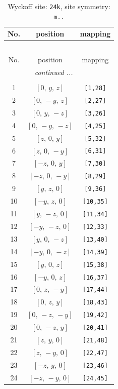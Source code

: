 \documentclass[fleqn,8pt]{jsarticle}
\begin{document}
\begin{longtable}{ccc}
\caption{Wyckoff site: {\tt 24k}, site symmetry: {\tt m..}}
 \\
 \hline \hline
No. & position & mapping \\ \hline \endfirsthead

\multicolumn{2}{l}{\tablename\ \thetable{}} \\
 \hline \hline
No. & position & mapping \\ \hline \endhead

 \hline \hline
\multicolumn{2}{r}{\footnotesize\it continued ...} \\ \endfoot

 \hline \hline
\multicolumn{2}{r}{} \\ \endlastfoot

1 & $\left[ 0,\, y,\, z \right]$ & {\tt [1,28]} \\ \hline
2 & $\left[ 0,\, - y,\, z \right]$ & {\tt [2,27]} \\ \hline
3 & $\left[ 0,\, y,\, - z \right]$ & {\tt [3,26]} \\ \hline
4 & $\left[ 0,\, - y,\, - z \right]$ & {\tt [4,25]} \\ \hline
5 & $\left[ z,\, 0,\, y \right]$ & {\tt [5,32]} \\ \hline
6 & $\left[ z,\, 0,\, - y \right]$ & {\tt [6,31]} \\ \hline
7 & $\left[ - z,\, 0,\, y \right]$ & {\tt [7,30]} \\ \hline
8 & $\left[ - z,\, 0,\, - y \right]$ & {\tt [8,29]} \\ \hline
9 & $\left[ y,\, z,\, 0 \right]$ & {\tt [9,36]} \\ \hline
10 & $\left[ - y,\, z,\, 0 \right]$ & {\tt [10,35]} \\ \hline
11 & $\left[ y,\, - z,\, 0 \right]$ & {\tt [11,34]} \\ \hline
12 & $\left[ - y,\, - z,\, 0 \right]$ & {\tt [12,33]} \\ \hline
13 & $\left[ y,\, 0,\, - z \right]$ & {\tt [13,40]} \\ \hline
14 & $\left[ - y,\, 0,\, - z \right]$ & {\tt [14,39]} \\ \hline
15 & $\left[ y,\, 0,\, z \right]$ & {\tt [15,38]} \\ \hline
16 & $\left[ - y,\, 0,\, z \right]$ & {\tt [16,37]} \\ \hline
17 & $\left[ 0,\, z,\, - y \right]$ & {\tt [17,44]} \\ \hline
18 & $\left[ 0,\, z,\, y \right]$ & {\tt [18,43]} \\ \hline
19 & $\left[ 0,\, - z,\, - y \right]$ & {\tt [19,42]} \\ \hline
20 & $\left[ 0,\, - z,\, y \right]$ & {\tt [20,41]} \\ \hline
21 & $\left[ z,\, y,\, 0 \right]$ & {\tt [21,48]} \\ \hline
22 & $\left[ z,\, - y,\, 0 \right]$ & {\tt [22,47]} \\ \hline
23 & $\left[ - z,\, y,\, 0 \right]$ & {\tt [23,46]} \\ \hline
24 & $\left[ - z,\, - y,\, 0 \right]$ & {\tt [24,45]} \\
\end{longtable}
\end{document}
